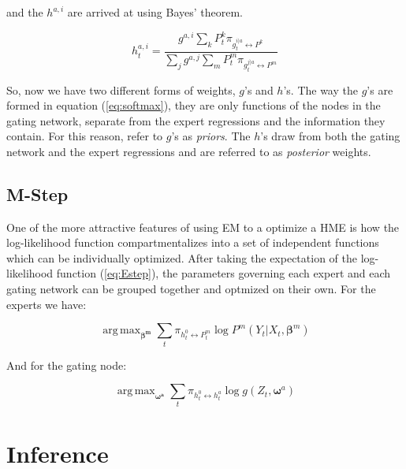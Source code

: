 \documentclass[12pt]{article}
\newcommand{\gateprod}[2]{\pi_{#1 \longleftrightarrow #2}}
\newcommand{\shortsum}[1]{\sum \nolimits_{#1}}
\newcommand{\h}[2]{h^{#1}_{#2}}
\DeclareMathOperator*{\argmax}{arg\,max}
\begin{document}
and the $h^{a, i}$ are arrived at using Bayes' theorem.

\begin{equation} \label{eq:posteriornode}
  \h{a,i}{t} = \frac{g^{a, i} \shortsum{k} P^{k}_{t} \gateprod{g^{i|a}_{t}}{P^{k}}}{\shortsum{j} g^{a, j} \shortsum{m} P^{m}_{t} \gateprod{g^{j|a}_{t}}{P^{m}}}
\end{equation}


So, now we have two different forms of weights, $g$'s and $h$'s. The
way the $g$'s are formed in equation (\ref{eq:softmax}), they are only
functions of the nodes in the gating network, separate from the
expert regressions and the information they contain. For this reason,
\cite{JordanJacobs1993} refer to $g$'s as \textit{priors}.
The $h$'s draw from both the gating network and the expert regressions and
are referred to as \textit{posterior} weights.


\subsection{M-Step}

One of the more attractive features of using EM to a optimize a
HME is how the log-likelihood function compartmentalizes into a set 
of independent functions which can be individually optimized. After
taking the expectation of the log-likelihood function (\ref{eq:Estep}), the
parameters governing each expert and each gating network can be grouped
together and optmized on their own. For the experts we have:

\begin{equation}
  \argmax_{\boldsymbol{\beta^{m}}} \sum_{t} \gateprod{h^{0}_{t}}{P^{m}_{t}} \log P^{m} (Y_{t}|X_{t}, \boldsymbol{\beta}^{m})
\end{equation}

And for the gating node:

\begin{equation}
  \argmax_{\boldsymbol{\omega^{a}}} \sum_{t} \gateprod{h^{0}_{t}}{h^{a}_{t}} \log g(Z_{t}, \boldsymbol{\omega}^{a})
\end{equation}



\section{Inference} \label{sec:Inference}
\end{document}
